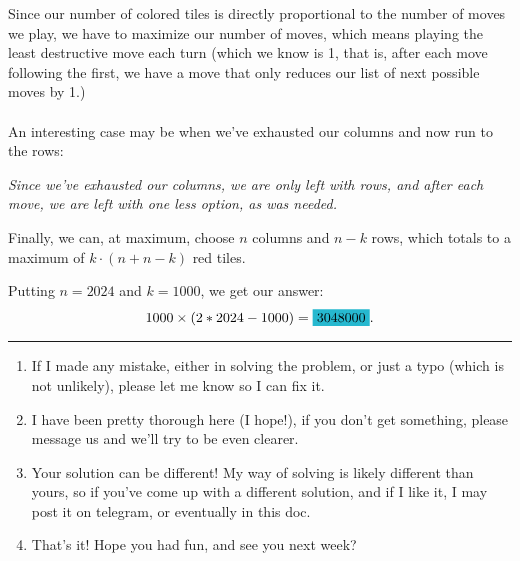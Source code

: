 \documentclass[12pt, letterpaper]{article}
\begin{document}
Since our number of colored tiles is directly proportional to the number of moves we play, we have to maximize our number of moves, which means playing the least destructive move each turn (which we know is 1, that is, after each move following the first, we have a move that only reduces our list of next possible moves by 1.)\\\\ An interesting case may be when we've exhausted our columns and now run to the rows:

\begin{center}
\end{center}

\textit{Since we've exhausted our columns, we are only left with rows, and after each move, we are left with one less option, as was needed.}

Finally, we can, at maximum, choose $n$ columns and $n-k$ rows, which totals to a maximum of $k\cdot (n + n - k)$ red tiles.

Putting $n=2024$ and $k=1000$, we get our answer: \[
1000 \times (2*2024 - 1000) = \colorbox{Turquoise}{3048000}.
\]

\newpage

{\color{RubineRed} \rule{\linewidth}{0.5mm}}
\vspace{20pt}
\begin{enumerate} 
\item  If I made any mistake, either in solving the problem, or just a typo (which is not unlikely), please let me know so I can fix it.
\item I have been pretty thorough here (I hope!), if you don't get something, please message us and we'll try to be even clearer.
\item Your solution can be different! My way of solving is likely different than yours, so if you've come up with a different solution, and if I like it, I may post it on telegram, or eventually in this doc.
\item That's it! Hope you had fun, and see you next week?
\end{enumerate}

\vspace{50pt}
\begin{center}
\end{center}
\end{document}
